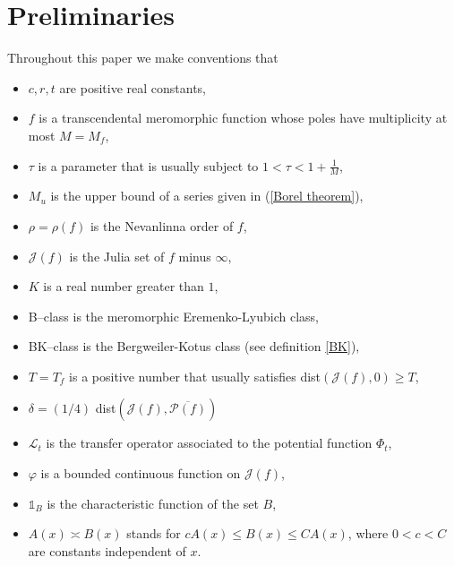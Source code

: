 \documentclass[12pt,reqno]{amsart}
\begin{document}
\section{Preliminaries}
Throughout this paper we make conventions that 
\begin{itemize}
    \item $c, r, t$ are positive real constants,
    \item $f$ is a transcendental meromorphic function whose poles have multiplicity at most $M=M_f$,
    \item $\tau$ is a parameter that is usually subject to $1<\tau<1+\frac{1}{M}$,
    \item $M_u$ is the upper bound of a series given in (\ref{Borel theorem}),
    \item $\rho=\rho(f)$ is the Nevanlinna order of $f$,
    \item $\mathcal{J}(f)$ is the Julia set of $f$ minus $\infty$,
    \item $K$ is a real number greater than $1$,
    \item B--class is the  meromorphic Eremenko-Lyubich class,
    \item BK--class is the Bergweiler-Kotus class (see definition \ref{BK}),
    \item $T=T_f$ is a positive number that usually satisfies dist$(\mathcal{J}(f), 0)\geq T$,
    \item $\delta=(1/4)$ dist$(\mathcal{J}(f),\overline{\mathcal{P}(f)})$
    \item $\mathcal{L}_t$ is the transfer operator associated to the potential function $\Phi_t$,
    \item $\varphi$ is a bounded continuous function on $\mathcal{J}(f)$,
    \item $\mathbb{1}_B$ is the characteristic function of the set $B$,
    \item $A(x) \asymp B(x)$ stands for $c A(x) \leq B(x) \leq CA(x)$, where $0<c<C$ are constants independent of $x$.
\end{itemize}
\end{document}
